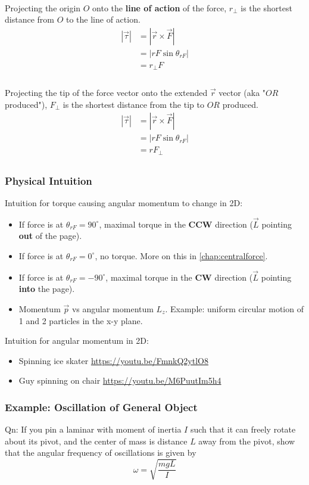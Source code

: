 \documentclass{article}
\begin{document}
{\begin{figure}
\end{figure}
\\[20pt]Projecting the origin $O$ onto the \textbf{line of action} of the force, $r_\perp$ is the shortest distance from $O$ to the line of action.
\begin{align*}
|\vec{\tau}| & =|\vec{r} \times \vec{F}| \\
& =|r F \sin \theta_{rF}| \\
& =r_{\perp} F \\
\end{align*}\\[10pt]
Projecting the tip of the force vector onto the extended $\vec{r}$ vector (aka "$OR$ produced"), $F_\perp$ is the shortest distance from the tip to $OR$ produced.
\begin{align*}
|\vec{\tau}| & =|\vec{r} \times \vec{F}| \\
& =|r F \sin \theta_{rF}| \\
& =r F_{\perp} \\
\end{align*}
}
\clearpage
\subsubsection{Physical Intuition} 
Intuition for torque causing angular momentum to change in 2D: 
\begin{itemize}
    \item If force is at $\theta_{rF} = 90^\circ$, maximal torque in the \textbf{CCW} direction ($\vec{L}$ pointing \textbf{out} of the page).
    \item If force is at $\theta_{rF} = 0^\circ$, no torque. More on this in \ref{chap:centralforce}.
    \item If force is at $\theta_{rF} = -90^\circ$, maximal torque in the \textbf{CW} direction ($\vec{L}$ pointing \textbf{into} the page).
    \item Momentum $\vec{p}$ vs angular momentum $L_z$. Example: uniform circular motion of 1 and 2 particles in the x-y plane.
\end{itemize}
Intuition for angular momentum in 2D:
\begin{itemize}
    \item Spinning ice skater \url{https://youtu.be/FmnkQ2ytlO8}
    \item Guy spinning on chair \url{https://youtu.be/M6PuutIm5h4}
\end{itemize}
\subsubsection{Example: Oscillation of General Object}
Qn: If you pin a laminar with moment of inertia $I$ such that it can freely rotate about its pivot, and the center of mass is distance $L$ away from the pivot, show that the angular frequency of oscillations is given by $$\omega = \sqrt{\frac{mgL}{I}}$$
\end{document}
